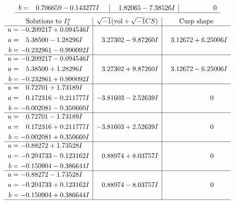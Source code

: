 \documentclass[1p]{elsarticle_modified}
\theoremstyle{definition}
\newcommand{\I}{\sqrt{-1}}
\begin{document}
$$\begin{array}{c|c|c}
\begin{aligned}
b &= \phantom{-}0.706659 - 0.143277 I\end{aligned}
 & \phantom{-}1.82065 - 7.38526 I & \phantom{-0.000000 } 0\\
 \hline 
 \end{array}$$\newpage$$\begin{array}{c|c|c}  
\text{Solutions to }I^u_{1}& \I (\text{vol} + \sqrt{-1}CS) & \text{Cusp shape}\\
 \hline 
\begin{aligned}
u &= -0.209217 + 0.094546 I \\
a &= \phantom{-}5.38500 - 1.28296 I \\
b &= -0.232961 - 0.990092 I\end{aligned}
 & \phantom{-}3.27302 - 9.87260 I & \phantom{-}3.12672 + 6.25006 I \\ \hline\begin{aligned}
u &= -0.209217 - 0.094546 I \\
a &= \phantom{-}5.38500 + 1.28296 I \\
b &= -0.232961 + 0.990092 I\end{aligned}
 & \phantom{-}3.27302 + 9.87260 I & \phantom{-}3.12672 - 6.25006 I \\ \hline\begin{aligned}
u &= \phantom{-}0.72701 + 1.73189 I \\
a &= \phantom{-}0.172316 - 0.211777 I \\
b &= -0.002081 - 0.350660 I\end{aligned}
 & -3.81603 - 2.52639 I & \phantom{-0.000000 } 0 \\ \hline\begin{aligned}
u &= \phantom{-}0.72701 - 1.73189 I \\
a &= \phantom{-}0.172316 + 0.211777 I \\
b &= -0.002081 + 0.350660 I\end{aligned}
 & -3.81603 + 2.52639 I & \phantom{-0.000000 } 0 \\ \hline\begin{aligned}
u &= -0.88272 + 1.73528 I \\
a &= -0.204733 - 0.123162 I \\
b &= -0.150904 - 0.386644 I\end{aligned}
 & \phantom{-}0.88974 + 8.03757 I & \phantom{-0.000000 } 0 \\ \hline\begin{aligned}
u &= -0.88272 - 1.73528 I \\
a &= -0.204733 + 0.123162 I \\
b &= -0.150904 + 0.386644 I\end{aligned}
 & \phantom{-}0.88974 - 8.03757 I & \phantom{-0.000000 } 0\\
 \hline 
 \end{array}$$\newpage\newpage\renewcommand{\arraystretch}{1}
\end{document}

